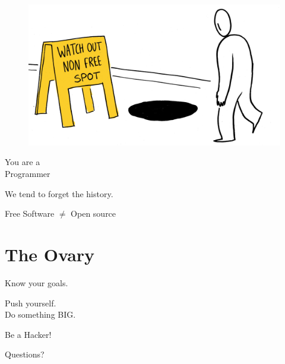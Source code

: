 \documentclass[notes,usenames,dvipsnames]{beamer}       %
\begin{document}
\begin{frame}
  \begin{figure}
    \centering
    \includegraphics[scale=0.3]{img/fs-small-sacrifice}
  \end{figure}
\end{frame}

\begin{frame}%
  \begin{center}
    \huge You are a \\
    \Huge Programmer
  \end{center}
\end{frame}

\begin{frame}%
  \begin{center}
    \Huge We tend to forget the history.
  \end{center}
\end{frame}

\begin{frame}%
  \begin{center}
    \Huge Free Software {$\neq$} Open source
  \end{center}
\end{frame}

\section{The Ovary}

\begin{frame}
  \begin{center}
    \Huge Know your goals.
  \end{center}
\end{frame}

\begin{frame}
  \begin{center}
    \huge Push yourself. \\
    \Huge Do something BIG.
  \end{center}
\end{frame}

\begin{frame}
  \begin{center}
    \Huge Be a Hacker!
  \end{center}
\end{frame}

\begin{frame}[standout]
  \Huge Questions?
\end{frame}
\end{document}
